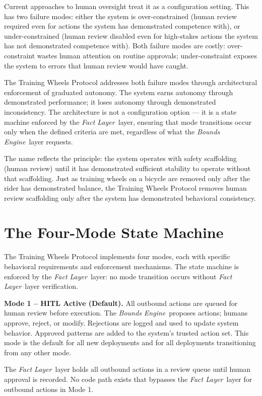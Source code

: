 \documentclass[12pt]{article}
\newcommand{\bounds}{\textit{Bounds Engine}}
\newcommand{\fact}{\textit{Fact Layer}}
\begin{document}
Current approaches to human oversight treat it as a configuration setting. This has two failure modes: either the system is over-constrained (human review required even for actions the system has demonstrated competence with), or under-constrained (human review disabled even for high-stakes actions the system has not demonstrated competence with). Both failure modes are costly: over-constraint wastes human attention on routine approvals; under-constraint exposes the system to errors that human review would have caught.

The Training Wheels Protocol addresses both failure modes through architectural enforcement of graduated autonomy. The system earns autonomy through demonstrated performance; it loses autonomy through demonstrated inconsistency. The architecture is not a configuration option --- it is a state machine enforced by the \fact\ layer, ensuring that mode transitions occur only when the defined criteria are met, regardless of what the \bounds\ layer requests.

The name reflects the principle: the system operates with safety scaffolding (human review) until it has demonstrated sufficient stability to operate without that scaffolding. Just as training wheels on a bicycle are removed only after the rider has demonstrated balance, the Training Wheels Protocol removes human review scaffolding only after the system has demonstrated behavioral consistency.

\section{The Four-Mode State Machine}
\label{sec:statemachine}

The Training Wheels Protocol implements four modes, each with specific behavioral requirements and enforcement mechanisms. The state machine is enforced by the \fact\ layer: no mode transition occurs without \fact\ layer verification.

\medskip\noindent\textbf{Mode 1 -- HITL Active (Default).}
All outbound actions are queued for human review before execution. The \bounds\ proposes actions; humans approve, reject, or modify. Rejections are logged and used to update system behavior. Approved patterns are added to the system's trusted action set. This mode is the default for all new deployments and for all deployments transitioning from any other mode.

The \fact\ layer holds all outbound actions in a review queue until human approval is recorded. No code path exists that bypasses the \fact\ layer for outbound actions in Mode 1.
\end{document}
